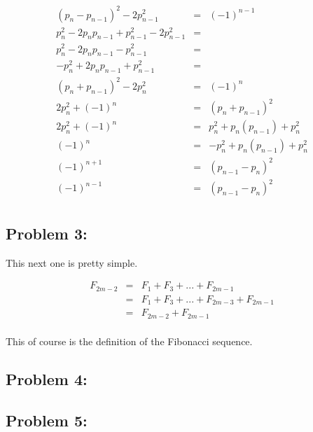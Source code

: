 \documentclass[a4paper]{article}
\begin{document}
\begin{equation}
\begin{array}{rll}
(p_n - p_{n-1})^2 - 2p^2_{n-1} & = & (-1)^{n-1} \\[.05in]
p_n^2 - 2p_n p_{n-1} + p_{n-1}^2 - 2p_{n-1}^2 & = & \\[.05in]
p_n^2 - 2p_n p_{n-1} - p_{n-1}^2 & = & \\[.05in]
-p_n^2 + 2p_n p_{n-1} + p_{n-1}^2 & = & \\[.05in]
(p_n + p_{n-1})^2 - 2p_n^2 & = & (-1)^{n} \\[.05in]
2p_n^2 + (-1)^n & = & (p_n + p_{n-1})^2 \\[.05in]
2p_n^2 + (-1)^n & = & p_n^2 + p_n(p_{n-1}) + p_n^2 \\[.05in]
(-1)^n & = & -p_n^2 + p_n(p_{n-1}) + p_n^2 \\[.05in]
(-1)^{n+1} & = & (p_{n-1} - p_n)^2 \\[.05in]
(-1)^{n-1} & = & (p_{n-1} - p_n)^2 \\[.05in]
\end{array}
\end{equation}	

\subsection*{Problem 3:}

This next one is pretty simple.

\begin{equation}
\begin{array}{rll}
F_{2m-2} & = & F_1 + F_3 + ... + F_{2m-1} \\[.1in]
& = & F_1 + F_3 + ... + F_{2m-3} + F_{2m-1} \\[.1in]
& = & F_{2m-2} + F_{2m-1} \\[.1in]
\end{array}
\end{equation}	

This of course is the definition of the Fibonacci sequence.

\subsection*{Problem 4:}


\subsection*{Problem 5:}
\end{document}
